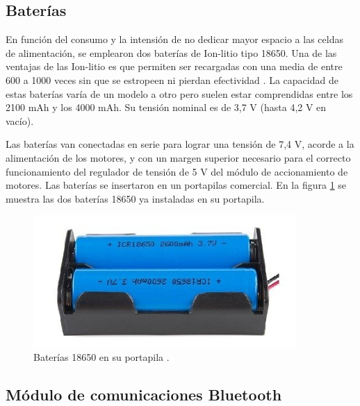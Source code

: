 \subsection{Baterías}

En función del consumo y la intensión de no dedicar mayor espacio a las celdas de alimentación, se emplearon dos baterías de Ion-litio tipo 18650. Una de las ventajas de las Ion-litio es que permiten ser recargadas con una media de entre 600 a 1000 veces sin que se estropeen ni pierdan efectividad \citep{18650}. La capacidad de estas baterías varía de un modelo a otro pero suelen estar comprendidas entre los 2100 mAh y los 4000 mAh. Su tensión nominal es de 3,7 V (hasta 4,2 V en vacío).

Las baterías van conectadas en serie para lograr una tensión de 7,4 V, acorde a la alimentación de los motores, y con un margen superior necesario para el correcto funcionamiento del regulador de tensión de 5 V del módulo de accionamiento de motores. 
Las baterías se insertaron en un portapilas comercial. En la figura \ref{fig:portapila} se muestra las dos baterías 18650 ya instaladas en su portapila.


\begin{figure}[h]
	\centering
	\includegraphics[width=10cm]{./Figures/portapilas.PNG}
	\caption{Baterías 18650 en su portapila .}
	\label{fig:portapila}
\end{figure}



\subsection{Módulo de comunicaciones Bluetooth}


